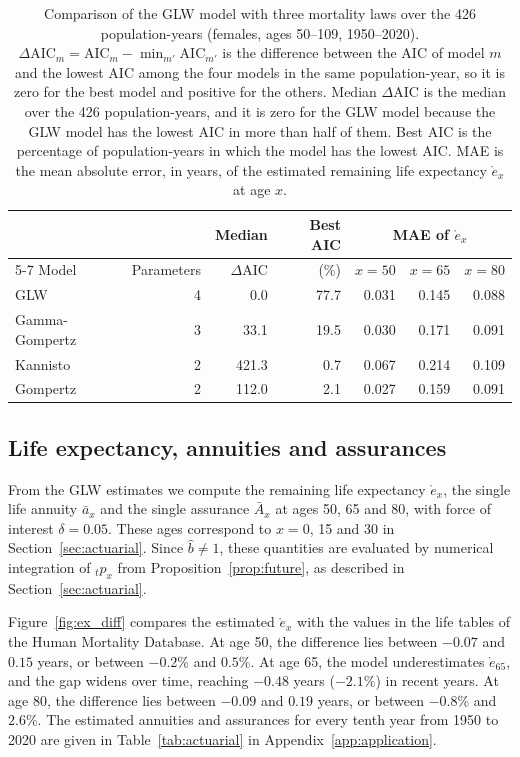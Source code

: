 \documentclass[12pt]{article}
\begin{document}
\begin{table}[tbp]
\centering
\small
\caption{Comparison of the GLW model with three mortality laws over the 426 population-years (females, ages 50--109, 1950--2020). $\Delta\mathrm{AIC}_m=\mathrm{AIC}_m-\min_{m'}\mathrm{AIC}_{m'}$ is the difference between the AIC of model $m$ and the lowest AIC among the four models in the same population-year, so it is zero for the best model and positive for the others. Median $\Delta\mathrm{AIC}$ is the median over the 426 population-years, and it is zero for the GLW model because the GLW model has the lowest AIC in more than half of them. Best AIC is the percentage of population-years in which the model has the lowest AIC. MAE is the mean absolute error, in years, of the estimated remaining life expectancy $\mathring{e}_x$ at age $x$.}
\label{tab:benchmark}
\begin{tabular*}{\textwidth}{@{\extracolsep{\fill}}lrrrrrr}
\toprule
 & & Median & Best AIC & \multicolumn{3}{c}{MAE of $\mathring{e}_x$}\\
\cmidrule(lr){5-7}
Model & Parameters & $\Delta\mathrm{AIC}$ & (\%) & $x=50$ & $x=65$ & $x=80$\\
\midrule
GLW & 4 & 0.0 & 77.7 & 0.031 & 0.145 & 0.088\\
Gamma-Gompertz & 3 & 33.1 & 19.5 & 0.030 & 0.171 & 0.091\\
Kannisto & 2 & 421.3 & 0.7 & 0.067 & 0.214 & 0.109\\
Gompertz & 2 & 112.0 & 2.1 & 0.027 & 0.159 & 0.091\\
\bottomrule
\end{tabular*}
\end{table}

\subsection{Life expectancy, annuities and assurances}

From the GLW estimates we compute the remaining life expectancy $\mathring{e}_x$, the single life annuity $\bar{a}_x$ and the single assurance $\bar{A}_x$ at ages 50, 65 and 80, with force of interest $\delta=0.05$. These ages correspond to $x=0$, 15 and 30 in Section~\ref{sec:actuarial}. Since $\hat b\neq1$, these quantities are evaluated by numerical integration of ${}_tp_x$ from Proposition~\ref{prop:future}, as described in Section~\ref{sec:actuarial}.

Figure~\ref{fig:ex_diff} compares the estimated $\mathring{e}_x$ with the values in the life tables of the Human Mortality Database. At age 50, the difference lies between $-0.07$ and $0.15$ years, or between $-0.2\%$ and $0.5\%$. At age 65, the model underestimates $\mathring{e}_{65}$, and the gap widens over time, reaching $-0.48$ years ($-2.1\%$) in recent years. At age 80, the difference lies between $-0.09$ and $0.19$ years, or between $-0.8\%$ and $2.6\%$. The estimated annuities and assurances for every tenth year from 1950 to 2020 are given in Table~\ref{tab:actuarial} in Appendix~\ref{app:application}.
\end{document}
